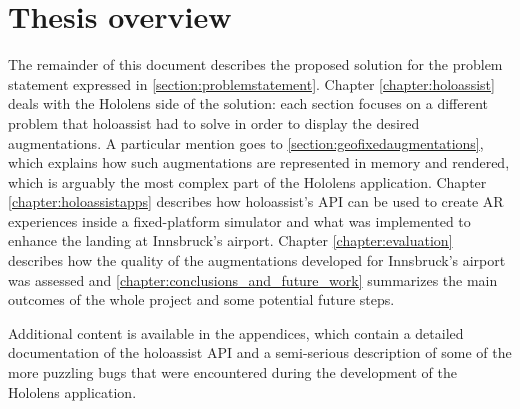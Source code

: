 \section{Thesis overview}

The remainder of this document describes the proposed solution for the problem statement expressed in \autoref{section:problemstatement}. Chapter \ref{chapter:holoassist} deals with the Hololens side of the solution: each section focuses on a different problem that \gls{holoassist} had to solve in order to display the desired augmentations. A particular mention goes to \autoref{section:geofixedaugmentations}, which explains how such augmentations are represented in memory and rendered, which is arguably the most complex part of the Hololens application. Chapter \ref{chapter:holoassistapps} describes how \gls{holoassist}'s \gls{API} can be used to create \gls{AR} experiences inside a fixed-platform simulator and what was implemented to enhance the landing at Innsbruck's airport. Chapter \ref{chapter:evaluation} describes how the quality of the augmentations developed for Innsbruck's airport was assessed and \autoref{chapter:conclusions_and_future_work} summarizes the main outcomes of the whole project and some potential future steps.

Additional content is available in the appendices, which contain a detailed documentation of the \gls{holoassist} \gls{API} and a semi-serious description of some of the more puzzling bugs that were encountered during the development of the Hololens application.